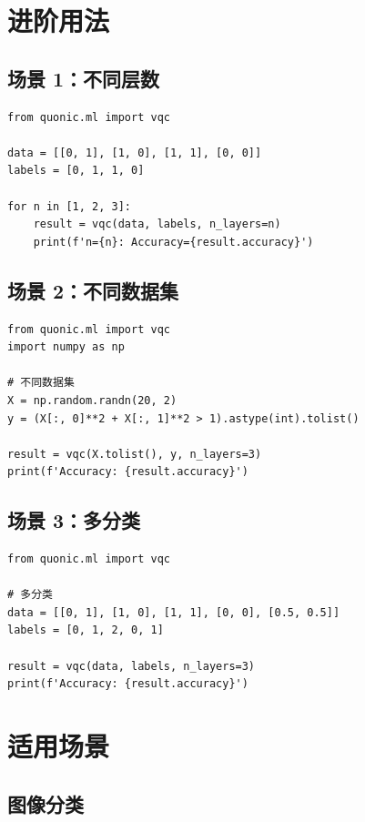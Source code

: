 \documentclass[12pt,a4paper]{article}
\begin{document}
\section{进阶用法}

\subsection{场景 1：不同层数}

\begin{verbatim}
from quonic.ml import vqc

data = [[0, 1], [1, 0], [1, 1], [0, 0]]
labels = [0, 1, 1, 0]

for n in [1, 2, 3]:
    result = vqc(data, labels, n_layers=n)
    print(f'n={n}: Accuracy={result.accuracy}')
\end{verbatim}

\subsection{场景 2：不同数据集}

\begin{verbatim}
from quonic.ml import vqc
import numpy as np

# 不同数据集
X = np.random.randn(20, 2)
y = (X[:, 0]**2 + X[:, 1]**2 > 1).astype(int).tolist()

result = vqc(X.tolist(), y, n_layers=3)
print(f'Accuracy: {result.accuracy}')
\end{verbatim}

\subsection{场景 3：多分类}

\begin{verbatim}
from quonic.ml import vqc

# 多分类
data = [[0, 1], [1, 0], [1, 1], [0, 0], [0.5, 0.5]]
labels = [0, 1, 2, 0, 1]

result = vqc(data, labels, n_layers=3)
print(f'Accuracy: {result.accuracy}')
\end{verbatim}

\section{适用场景}

\subsection{图像分类}
\end{document}
